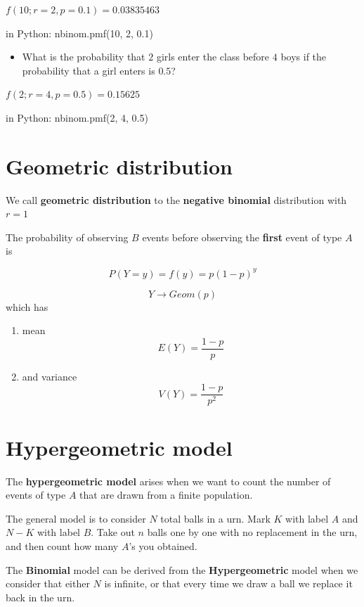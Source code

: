 \documentclass[
]{book}
\providecommand{\tightlist}{%
  \setlength{\itemsep}{0pt}\setlength{\parskip}{0pt}}
\begin{document}
\(f(10; r=2, p=0.1)=0.03835463\)

in Python: nbinom.pmf(10, 2, 0.1)

\begin{itemize}
\tightlist
\item
  What is the probability that \(2\) girls enter the class before \(4\) boys if the probability that a girl enters is \(0.5\)?
\end{itemize}

\(f(2; r=4, p=0.5)=0.15625\)

in Python: nbinom.pmf(2, 4, 0.5)

\hypertarget{geometric-distribution}{%
\section{Geometric distribution}\label{geometric-distribution}}

We call \textbf{geometric distribution} to the \textbf{negative binomial} distribution with \(r=1\)

The probability of observing \(B\) events before observing the \textbf{first} event of type \(A\) is

\[P(Y=y)=f(y)= p(1-p)^y\]

\[Y\rightarrow Geom(p)\]
which has

\begin{enumerate}
\def\labelenumi{\arabic{enumi})}
\item
  mean \[E(Y)= \frac{1-p}{p}\]
\item
  and variance \[V(Y)= \frac{1-p}{p^2}\]
\end{enumerate}

\hypertarget{hypergeometric-model}{%
\section{Hypergeometric model}\label{hypergeometric-model}}

The \textbf{hypergeometric model} arises when we want to count the number of events of type \(A\) that are drawn from a finite population.

The general model is to consider \(N\) total balls in a urn. Mark \(K\) with label \(A\) and \(N-K\) with label \(B\). Take out \(n\) balls one by one with no replacement in the urn, and then count how many \(A\)'s you obtained.

The \textbf{Binomial} model can be derived from the \textbf{Hypergeometric} model when we consider that either \(N\) is infinite, or that every time we draw a ball we replace it back in the urn.
\end{document}
